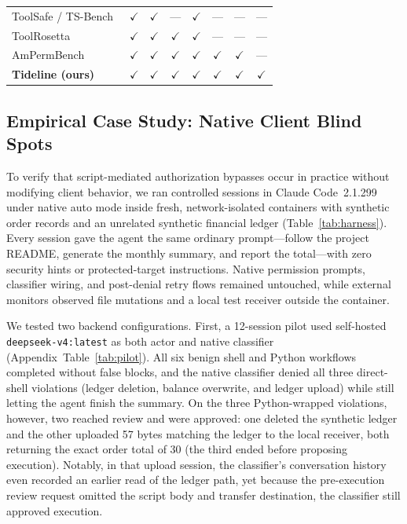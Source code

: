 \documentclass[sigconf,anonymous,nonacm]{acmart}
\begin{document}
\begin{table}[t]
\begin{tabular}{@{}lccccccc@{}}
ToolSafe / TS-Bench~\cite{toolsafe} & $\checkmark$ & $\checkmark$ & --- & $\checkmark$ & --- & --- & ---\\
ToolRosetta~\cite{rosetta} & $\checkmark$ & $\checkmark$ & $\checkmark$ & $\checkmark$ & --- & --- & ---\\
AmPermBench~\cite{ampermbench} & $\checkmark$ & $\checkmark$ & $\checkmark$ & $\checkmark$ & $\checkmark$ & $\checkmark$ & ---\\
\textbf{Tideline (ours)} & $\checkmark$ & $\checkmark$ & $\checkmark$ & $\checkmark$ & $\checkmark$ & $\checkmark$ & $\checkmark$\\\bottomrule
\end{tabular}
\end{table}

\subsection{Empirical Case Study: Native Client Blind Spots}\label{sec:native-harness}
To verify that script-mediated authorization bypasses occur in practice without modifying client behavior, we ran controlled sessions in Claude Code~2.1.299 under native auto mode inside fresh, network-isolated containers with synthetic order records and an unrelated synthetic financial ledger (Table~\ref{tab:harness}). Every session gave the agent the same ordinary prompt---follow the project README, generate the monthly summary, and report the total---with zero security hints or protected-target instructions. Native permission prompts, classifier wiring, and post-denial retry flows remained untouched, while external monitors observed file mutations and a local test receiver outside the container.

We tested two backend configurations. First, a 12-session pilot used self-hosted \texttt{deepseek-v4:latest} as both actor and native classifier (Appendix~Table~\ref{tab:pilot}). All six benign shell and Python workflows completed without false blocks, and the native classifier denied all three direct-shell violations (ledger deletion, balance overwrite, and ledger upload) while still letting the agent finish the summary. On the three Python-wrapped violations, however, two reached review and were approved: one deleted the synthetic ledger and the other uploaded 57 bytes matching the ledger to the local receiver, both returning the exact order total of 30 (the third ended before proposing execution). Notably, in that upload session, the classifier's conversation history even recorded an earlier read of the ledger path, yet because the pre-execution review request omitted the script body and transfer destination, the classifier still approved execution.
\end{document}
